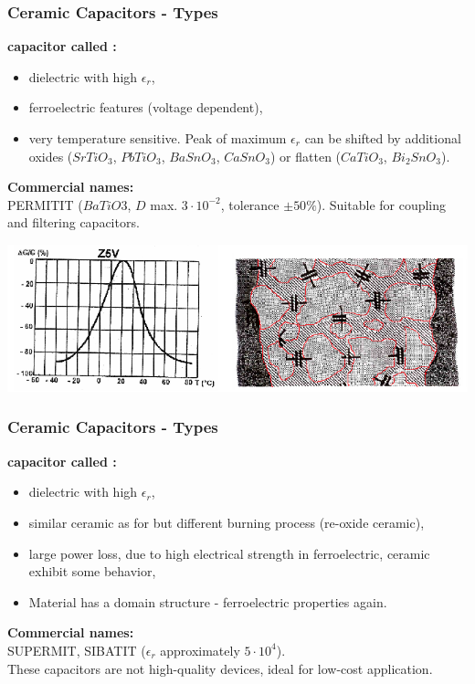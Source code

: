 \documentclass{beamer}
\begin{document}
	\begin{frame}
    \frametitle{Ceramic Capacitors - Types}
		\textbf{capacitor called : }
		\begin{itemize}
			\item dielectric with high $\epsilon_r$,
			\item ferroelectric features (voltage dependent),
			\item very temperature sensitive. Peak of maximum $\epsilon_r$ can be shifted by additional oxides ($SrTiO_3$, $PbTiO_3$, $BaSnO_3$, $CaSnO_3$) or flatten ($CaTiO_3$, $Bi_2SnO_3$).
		\end{itemize}
		\small
		\textbf{Commercial names:} \\PERMITIT ($BaTiO3$, $D$ max. $3\cdot10^{-2}$, tolerance $\pm 50 \%$). Suitable for coupling and filtering capacitors.
		\begin{center}
			\includegraphics[scale=0.45]{obr08_feroelektrikum.png}
		\end{center}
  \end{frame}
	\begin{frame}
    \frametitle{Ceramic Capacitors - Types}
		\textbf{capacitor called : }
		\begin{itemize}
			\item dielectric with high $\epsilon_r$,
			\item similar ceramic as for  but different burning process (re-oxide ceramic),
			\item large power loss, due to high electrical strength in ferroelectric, ceramic exhibit some  behavior,
			\item Material has a domain structure - ferroelectric properties again. 
		\end{itemize}
		\small
		\textbf{Commercial names:} \\SUPERMIT, SIBATIT ($\epsilon_r$ approximately $5\cdot 10^4$).\\These capacitors are not high-quality devices, ideal for low-cost application.

  \end{frame}
\end{document}
